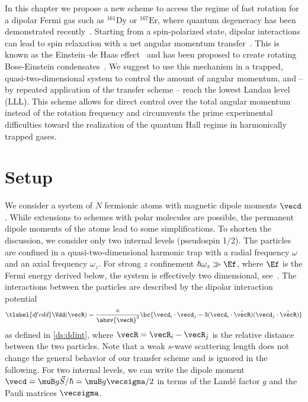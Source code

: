 In this chapter we propose a new scheme to access the regime of fast rotation for a dipolar Fermi gas such as $^{161}\text{Dy}$ or $^{167}\text{Er}$, where quantum degeneracy has been demonstrated recently~\cite{Lu2012,Aikawa2014}. Starting from a spin-polarized state, dipolar interactions can lead to spin relaxation with a net angular momentum transfer~\cite{Hensler2003}. This is known as the Einstein--de Haas effect~\cite{Einstein1915} and has been proposed to create rotating Bose-Einstein condensates~\cite{Santos2006,Kawaguchi2006}. We suggest to use this mechanism in a trapped, quasi-two-dimensional system to control the amount of angular momentum, and -- by repeated application of the transfer scheme -- reach the lowest Landau level (LLL). This scheme allows for direct control over the total angular momentum instead of the rotation frequency and circumvents the prime experimental difficulties toward the realization of the quantum Hall regime in harmonically trapped gases.

\section{Setup}
\begin{figure}
{}
\end{figure}

We consider a system of $N$ fermionic atoms with magnetic dipole moments $\vecd$. While extensions to schemes with polar molecules are possible, the permanent dipole moments of the atoms lead to some simplifications.
To shorten the discussion, we consider only two internal levels (pseudospin 1/2). The particles are confined in a quasi-two-dimensional harmonic trap with a radial frequency $\omega$ and an axial frequency $\omega_z$. For strong $z$ confinement $\hbar\omega_z \gg \Ef$, where $\Ef$ is the Fermi energy derived below, the system is effectively two dimensional, see~.
The interactions between the particles are described by the dipolar interaction potential
\begin{align} \tlabel{dfvdd}
\Vdd(\vecR) = \frac{\kappa}{\absv{\vecR}^3} \bc{ \vecd_i \cdot \vecd_j -3 (\vecd_i \cdot \hat{\vecR})(\vecd_j \cdot \hat{\vecR}) }
\end{align}
as defined in \cref{ds:ddint}, where $\vecR=\vecR_i-\vecR_j$ is the relative distance between the two particles.
Note that a weak $s$-wave scattering length does not change the general behavior of our transfer scheme and is ignored in the following.
For two internal levels, we can write the
dipole moment $\vecd =  \muB g \vec{S} / \hbar = \muB g \vecsigma/2$ in terms of the Land\'e factor $g$ and the Pauli matrices $\vecsigma$.

